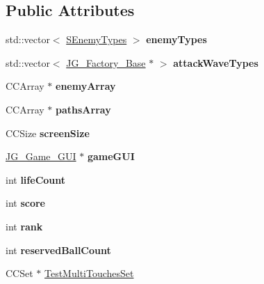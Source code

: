 \subsection*{Public Attributes}
\begin{DoxyCompactItemize}
\item 
\hypertarget{class_j_g___game___main_aaf56905c2a044f2688dc25a50ac26744}{std\-::vector$<$ \hyperlink{struct_s_enemy_types}{S\-Enemy\-Types} $>$ {\bfseries enemy\-Types}}\label{class_j_g___game___main_aaf56905c2a044f2688dc25a50ac26744}

\item 
\hypertarget{class_j_g___game___main_aaed93c186f2749821d75404bfda728b4}{std\-::vector$<$ \hyperlink{class_j_g___factory___base}{J\-G\-\_\-\-Factory\-\_\-\-Base} $\ast$ $>$ {\bfseries attack\-Wave\-Types}}\label{class_j_g___game___main_aaed93c186f2749821d75404bfda728b4}

\item 
\hypertarget{class_j_g___game___main_ab6b2ebabd65b3edd6a9bfb4e8aa66e3f}{C\-C\-Array $\ast$ {\bfseries enemy\-Array}}\label{class_j_g___game___main_ab6b2ebabd65b3edd6a9bfb4e8aa66e3f}

\item 
\hypertarget{class_j_g___game___main_a1e098ec50a34f9d57ad1ce91e718b113}{C\-C\-Array $\ast$ {\bfseries paths\-Array}}\label{class_j_g___game___main_a1e098ec50a34f9d57ad1ce91e718b113}

\item 
\hypertarget{class_j_g___game___main_a8974bfdd52077060e4561210cabd193f}{C\-C\-Size {\bfseries screen\-Size}}\label{class_j_g___game___main_a8974bfdd52077060e4561210cabd193f}

\item 
\hypertarget{class_j_g___game___main_a90cc04d9d60809db0b6efa97dfd9008e}{\hyperlink{class_j_g___game___g_u_i}{J\-G\-\_\-\-Game\-\_\-\-G\-U\-I} $\ast$ {\bfseries game\-G\-U\-I}}\label{class_j_g___game___main_a90cc04d9d60809db0b6efa97dfd9008e}

\item 
\hypertarget{class_j_g___game___main_a6946a041c2d1e0e1af8f668df4eaef1d}{int {\bfseries life\-Count}}\label{class_j_g___game___main_a6946a041c2d1e0e1af8f668df4eaef1d}

\item 
\hypertarget{class_j_g___game___main_a092aed9f82afd093223436207aaf95ee}{int {\bfseries score}}\label{class_j_g___game___main_a092aed9f82afd093223436207aaf95ee}

\item 
\hypertarget{class_j_g___game___main_ac19d330847a26686cff9c8c75c017928}{int {\bfseries rank}}\label{class_j_g___game___main_ac19d330847a26686cff9c8c75c017928}

\item 
\hypertarget{class_j_g___game___main_afd9990102a04718ae2a4a11addb0b5b8}{int {\bfseries reserved\-Ball\-Count}}\label{class_j_g___game___main_afd9990102a04718ae2a4a11addb0b5b8}

\item 
C\-C\-Set $\ast$ \hyperlink{class_j_g___game___main_abf4ca18c92688188dcf7bf60c73fa3ae}{Test\-Multi\-Touches\-Set}
\end{DoxyCompactItemize}


